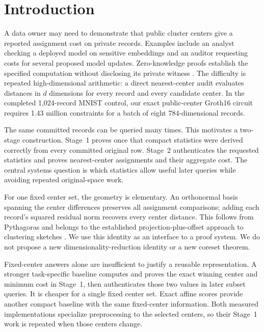 \section{Introduction}\label{sec:introduction}
A data owner may need to demonstrate that public cluster centers give a reported assignment cost on private records. Examples include an analyst checking a deployed model on sensitive embeddings and an auditor requesting costs for several proposed model updates. Zero-knowledge proofs establish the specified computation without disclosing its private witness \cite{gmr1991knowledge,groth2016}. The difficulty is repeated high-dimensional arithmetic: a direct nearest-center audit evaluates distances in $d$ dimensions for every record and every candidate center. In the completed 1,024-record MNIST control, our exact public-center Groth16 circuit requires 1.43 million constraints for a batch of eight 784-dimensional records.

The same committed records can be queried many times. This motivates a two-stage construction. Stage~1 proves once that compact statistics were derived correctly from every committed original row. Stage~2 authenticates the requested statistics and proves nearest-center assignments and their aggregate cost. The central systems question is which statistics allow useful later queries while avoiding repeated original-space work.

For one fixed center set, the geometry is elementary. An orthonormal basis spanning the center differences preserves all assignment comparisons; adding each record's squared residual norm recovers every center distance. This follows from Pythagoras and belongs to the established projection-plus-offset approach to clustering sketches \cite{feldman2013tiny,feldman2020tiny,cohen2015dimensionality}. We use this identity as an interface to a proof system. We do not propose a new dimensionality-reduction identity or a new coreset theorem.

Fixed-center answers alone are insufficient to justify a reusable representation. A stronger task-specific baseline computes and proves the exact winning center and minimum cost in Stage~1, then authenticates those two values in later subset queries. It is cheaper for a single fixed center set. Exact affine scores provide another compact baseline with the same fixed-center information. Both measured implementations specialize preprocessing to the selected centers, so their Stage~1 work is repeated when those centers change.

